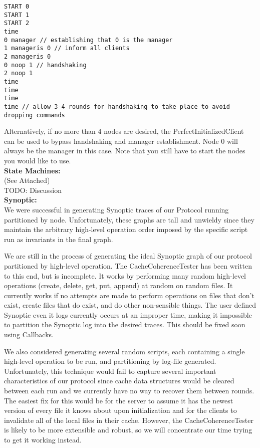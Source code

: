\documentclass[11pt]{article}
\begin{document}
\begin{verbatim}
START 0
START 1
START 2
time
0 manager // establishing that 0 is the manager
1 manageris 0 // inform all clients
2 manageris 0
0 noop 1 // handshaking
2 noop 1
time
time
time
time // allow 3-4 rounds for handshaking to take place to avoid dropping commands
\end{verbatim}

Alternatively, if no more than 4 nodes are desired, the PerfectInitializedClient can be used to bypass handshaking and manager establishment.
Node 0 will always be the manager in this case. Note that you still have to start the nodes you would like to use. \\

\textbf{State Machines:} \\

(See Attached) \\

TODO: Discussion \\

\textbf{Synoptic:} \\

We were successful in generating Synoptic traces of our Protocol running partitioned by node. Unfortunately, these graphs are tall and unwieldy since they
maintain the arbitrary high-level operation order imposed by the specific script run as invariants in the final graph.

We are still in the process of generating the ideal Synoptic graph of our protocol partitioned by high-level operation. The CacheCoherenceTester has been written to this end, but is incomplete.
It works by performing many random high-level operations (create, delete, get, put, append) at random on random files. It currently works if no attempts are made to
perform operations on files that don't exist, create files that do exist, and do other non-sensible things. The user defined Synoptic even it logs currently occurs at
an improper time, making it impossible to partition the Synoptic log into the desired traces. This should be fixed soon using Callbacks.

We also considered generating several random scripts, each containing a single high-level operation to be run, and partitioning by log-file generated. Unfortunately, this technique
would fail to capture several important characteristics of our protocol since cache data structures would be cleared between each run and we currently have no way to recover them between rounds.
The easiest fix for this would be for the server to assume it has the newest version of every file it knows about upon initialization and for the clients to invalidate all of the local files in their cache.
However, the CacheCoherenceTester is likely to be more extensible and robust, so we will concentrate our time trying to get it working instead. \\
\end{document}
